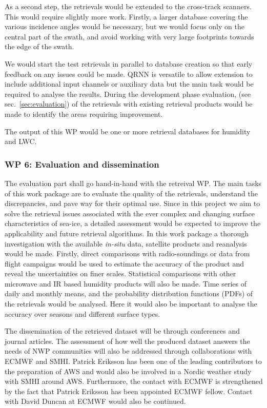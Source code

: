 \documentclass[12pt,oneside,a4paper]{article}
\begin{document}
As a second step, the retrievals would be extended to the cross-track scanners. This would require slightly more work. Firstly, a larger database covering the various incidence angles would be necessary, but we would focus only on the central part of the swath, and avoid working with very large footprints towards the edge of the swath. 


We would start the test retrievals in parallel to database creation so that early feedback on any issues could be made. QRNN is versatile to allow extension to include additional input channels or auxiliary data but the main task would be required to analyse the results. During the development phase evaluation, (see sec.~\ref{sec:evaluation}) of the retrievals with existing retrieval products would be made to identify the areas requiring improvement.

The output of this WP would be one or more retrieval databases for humidity and LWC.

\subsubsection*{WP 6: Evaluation and dissemination}
%
\label{sec:evaluation}
The evaluation part shall go hand-in-hand with the retreival WP. The main tasks of this work package are to evaluate the quality of the retrievals, understand the discrepancies, and pave way for their optimal use. Since in this project we aim to solve the retrieval issues associated with the ever complex and changing surface characteristics of sea-ice, a detailed assessment would be expected to improve the applicability and future retrieval algorithms. In this work package a thorough investigation with the available \textit{in-situ} data, satellite products and reanalysis would be made. Firstly, direct comparisons with radio-soundings or data from flight campaigns would be used to estimate the accuracy of the product and reveal the uncertainties on finer scales.  Statistical comparisons with other microwave and IR based humidity products  will also be made. Time series of daily and monthly means, and the probability distribution functions (PDFs) of the retrievals would be analysed. Here it would also be important to analyse the accuracy over seasons and different surface types. 

The dissemination of the retrieved dataset will be through conferences and journal articles. The assessment of how well the produced dataset answers the needs of NWP communities will also be addressed through collaborations with ECMWF and SMHI. Patrick Eriksson has been one of the leading contributors to the preparation of AWS and would also be involved in a Nordic weather study with SMHI around AWS. Furthermore, the contact with ECMWF is strengthened by the fact that Patrick Eriksson has been appointed ECMWF fellow. Contact with David Duncan at ECMWF would also be continued. 
\end{document}
